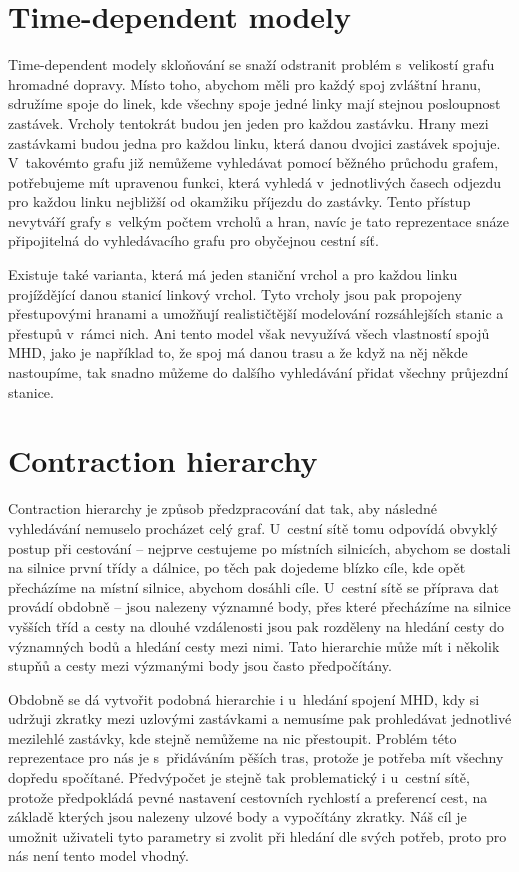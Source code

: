 \section{Time-dependent modely}
Time-dependent modely \cite{time-dependent}\TODO skloňování se snaží odstranit problém
s~velikostí grafu hromadné dopravy. Místo toho, abychom měli pro každý spoj
zvláštní hranu, sdružíme spoje do linek, kde všechny spoje jedné linky mají
stejnou posloupnost zastávek. Vrcholy tentokrát budou jen jeden pro každou
zastávku. Hrany mezi zastávkami budou jedna pro každou linku, která danou
dvojici zastávek spojuje. V~takovémto grafu již nemůžeme vyhledávat pomocí
běžného průchodu grafem, potřebujeme mít upravenou funkci, která vyhledá
v~jednotlivých časech odjezdu pro každou linku nejbližší od okamžiku příjezdu do
zastávky. Tento přístup nevytváří grafy s~velkým počtem vrcholů a hran, navíc je
tato reprezentace snáze připojitelná do vyhledávacího grafu pro obyčejnou cestní
síť.

Existuje také varianta, která má jeden staniční vrchol a
pro každou linku projíždějící danou stanicí linkový vrchol. Tyto vrcholy jsou
pak propojeny přestupovými hranami a umožňují realističtější modelování
rozsáhlejších stanic a přestupů v~rámci nich. Ani tento model však nevyužívá
všech vlastností spojů MHD, jako je například to, že spoj má danou trasu a že
když na něj někde nastoupíme, tak snadno můžeme do dalšího vyhledávání přidat všechny
průjezdní stanice.  

\section{Contraction hierarchy}
Contraction hierarchy \cite{CH} je způsob předzpracování dat tak, aby následné
vyhledávání nemuselo procházet celý graf. U~cestní sítě tomu odpovídá obvyklý
postup při cestování -- nejprve cestujeme po místních silnicích, abychom se
dostali na silnice první třídy a dálnice, po těch pak dojedeme blízko cíle, kde
opět přecházíme na místní silnice, abychom dosáhli cíle. U~cestní sítě se
příprava dat provádí obdobně -- jsou nalezeny významné body, přes které
přecházíme na silnice vyšších tříd a cesty na dlouhé vzdálenosti jsou pak
rozděleny na hledání cesty do významných bodů a hledání cesty mezi nimi. Tato
hierarchie může mít i několik stupňů a cesty mezi výzmanými body jsou často
předpočítány.

Obdobně se dá vytvořit podobná hierarchie i u~hledání spojení MHD, kdy si
udržuji zkratky mezi uzlovými zastávkami a nemusíme pak prohledávat jednotlivé
mezilehlé zastávky, kde stejně nemůžeme na nic přestoupit. Problém této
reprezentace pro nás je s~přidáváním pěších tras, protože je potřeba mít všechny dopředu
spočítané. Předvýpočet je stejně tak problematický i u~cestní sítě, protože
předpokládá pevné nastavení cestovních rychlostí a preferencí cest, na základě
kterých jsou nalezeny ulzové body a vypočítány zkratky. Náš cíl je umožnit
uživateli tyto parametry si zvolit při hledání dle svých potřeb, proto pro nás
není tento model vhodný. 

